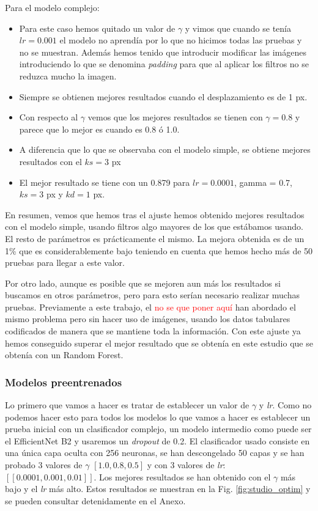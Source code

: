 \documentclass[a4paper,12pt,twoside,titlepage]{article}
\newcommand{\red}[1]{\textcolor{red}{#1}}
\begin{document}
Para el modelo complejo:
\begin{itemize}
  \item Para este caso hemos quitado un valor de $\gamma$ y vimos que cuando se tenía $lr = 0.001$ el modelo no aprendía por lo que no hicimos todas las pruebas y no se muestran. Además hemos tenido que introducir modificar las imágenes introduciendo lo que se denomina \textit{padding} para que al aplicar los filtros no se reduzca mucho la imagen.
    \item Siempre se obtienen mejores resultados cuando el desplazamiento es de 1 px.
  \item Con respecto al $\gamma$ vemos que los mejores resultados se tienen con $\gamma = 0.8$ y parece que lo mejor es cuando es 0.8 ó 1.0.
  \item A diferencia que lo que se observaba con el modelo simple, se obtiene mejores resultados con el $ks = 3$ px
  \item El mejor resultado se tiene con un 0.879 para $lr = 0.0001$, gamma = 0.7, $ks = 3$ px y $kd = 1$ px.
\end{itemize}

En resumen, vemos que hemos tras el ajuste hemos obtenido mejores resultados con el modelo simple, usando filtros algo mayores de los que estábamos usando. El resto de parámetros es prácticamente el mismo. La mejora obtenida es de un 1\% que es considerablemente bajo teniendo en cuenta que hemos hecho más de 50 pruebas para llegar a este valor.

Por otro lado, aunque es posible que se mejoren aun más los resultados si buscamos en otros parámetros, pero para esto serían necesario realizar muchas pruebas. Previamente a este trabajo, el \red{no se que poner aquí} han abordado el mismo problema pero sin hacer uso de imágenes, usando los datos tabulares codificados de manera que se mantiene toda la información. Con este ajuste ya hemos conseguido superar el mejor resultado que se obtenía en este estudio que se obtenía con un Random Forest.

\subsubsection*{Modelos preentrenados}

Lo primero que vamos a hacer es tratar de establecer un valor de $\gamma$ y \textit{lr}. Como no podemos hacer esto para todos los modelos lo que vamos a hacer es establecer un prueba inicial con un clasificador complejo, un modelo intermedio como puede ser el EfficientNet B2 y usaremos un \textit{dropout} de 0.2. El clasificador usado consiste en una única capa oculta con 256 neuronas, se han descongelado 50 capas y se han probado 3 valores de $\gamma$ $\left[1.0, 0.8, 0.5\right]$ y con 3 valores de \textit{lr}: $\left[[0.0001, 0.001, 0.01]\right]$. Los mejores resultados se han obtenido con el $\gamma$ más bajo y el \textit{lr} más alto. Estos resultados se muestran en la Fig. \ref{fig:studio_optim} y se pueden consultar detenidamente en el Anexo.
\end{document}
